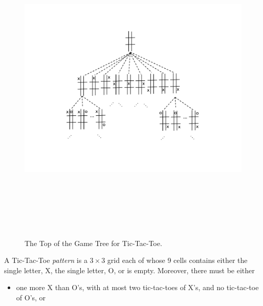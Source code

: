 \begin{definition}
\begin{figure}[htbp]
\centering
\includegraphics[height=6in]{figures/topgame.pdf}
\caption{The Top of the Game Tree for Tic-Tac-Toe.}
\label{fig:Tic-Tac-Toe}
\end{figure}

\begin{definition}

A Tic-Tac-Toe \emph{pattern} is a $3 \times 3$ grid each of whose 9 cells
contains either the single letter, X, the single letter, O, or is
empty.
\iffalse
Moreover, there must be either
\begin{itemize}

\item one more X than O's, with at most two tic-tac-toes of X's, and no
tic-tac-toe of O's, or


\end{itemize}
\end{definition}
\end{definition}
